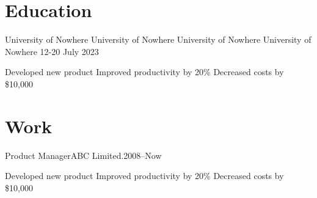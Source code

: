 \documentclass{my_cv}
\begin{document}

\section{Education}

{University of Nowhere University of Nowhere University of Nowhere University of Nowhere}
{12-20 July 2023}

\workitems
{Developed new product}
{Improved productivity by 20\%}
{Decreased costs by \$10,000}

\section{Work}
\datedsubsection
{Product Manager}{ABC Limited.}{2008--Now}

\workitems
{Developed new product}
{Improved productivity by 20\%}
{Decreased costs by \$10,000}

 

\thispagestyle{empty}
\end{document}
